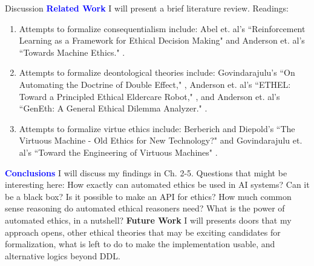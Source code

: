 \documentclass[11pt]{article}
\begin{document}
\begin{outline}[enumerate]
\1[Chapter 6] Discussion
\2 \textcolor{blue}{\textbf{Related Work}} I will present a brief literature review. Readings:
\begin{enumerate}
    \item Attempts to formalize consequentialism include: Abel et. al's ``Reinforcement Learning as a Framework for Ethical Decision Making" \cite{util1} and Anderson et. al's ``Towards Machine Ethics." \cite{util2}.
     \item Attempts to formalize deontological theories include: Govindarajulu's ``On Automating the Doctrine of Double Effect," \cite{dde}, Anderson et. al's ``ETHEL: Toward a Principled Ethical Eldercare Robot," \cite{deon1}, and Anderson et. al's ``GenEth: A General Ethical Dilemma Analyzer." \cite{deon2}.
    \item Attempts to formalize virtue ethics include: Berberich and Diepold's ``The Virtuous Machine - Old Ethics for New Technology?" \cite{virtue2} and Govindarajulu et. al's ``Toward the Engineering of Virtuous Machines" \cite{virtue1}.
\end{enumerate}
\2 \textcolor{blue}{\textbf{Conclusions}} I will discuss my findings in Ch. 2-5. Questions that might be interesting here:
\3 How exactly can automated ethics be used in AI systems? Can it be a black box? Is it possible to make an API for ethics?
\3 How much common sense reasoning do automated ethical reasoners need? 
\3 What is the power of automated ethics, in a nutshell?
\2 \textbf{Future Work} I will presents doors that my approach opens, other ethical theories that may be exciting candidates for formalization, what is left to do to make the implementation usable, and alternative logics beyond DDL.





\end{outline}


\end{document}

